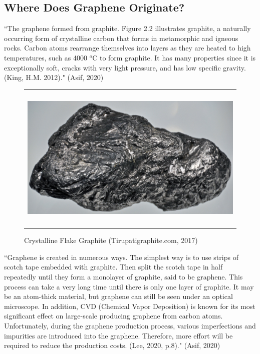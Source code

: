 \documentclass[a4paper,12pt]{article}
\numberwithin{equation}{section}
\numberwithin{figure}{section}
\begin{document}
\subsection{Where Does Graphene Originate?}

\noindent ``The graphene formed from graphite. Figure 2.2 illustrates graphite, a naturally occurring form of crystalline carbon that forms in metamorphic and igneous rocks. Carbon atoms rearrange themselves into layers as they are heated to high temperatures, such as 4000 $^{o}$C to form graphite. It has many properties since it is exceptionally soft, cracks with very light pressure, and has low specific gravity. (King, H.M. 2012)." (Asif, 2020)\vspace{\baselineskip}

\begin{figure}[H]
  \centering
  \begin{tabular}{@{}c@{}}
    \includegraphics[width=.75\linewidth,height=200pt]{Figures/Figure2.2.jpg} \\
  \end{tabular}
  \caption{Crystalline Flake Graphite (Tirupatigraphite.com, 2017)}
\end{figure}

\noindent ``Graphene is created in numerous ways. The simplest way is to use strips of scotch tape embedded with graphite. Then split the scotch tape in half repeatedly until they form a monolayer of graphite, said to be graphene. This process can take a very long time until there is only one layer of graphite. It may be an atom-thick material, but graphene can still be seen under an optical microscope. In addition, CVD (Chemical Vapor Deposition) is known for its most significant effect on large-scale producing graphene from carbon atoms. Unfortunately, during the graphene production process, various imperfections and impurities are introduced into the graphene. Therefore, more effort will be required to reduce the production costs. (Lee, 2020, p.8)." (Asif, 2020)\vspace{\baselineskip}
\end{document}
